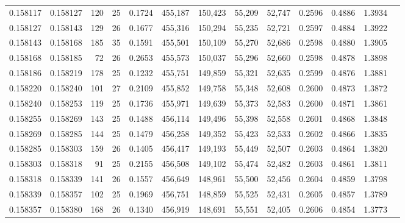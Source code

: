 \begin{tabular}{rrrrrrrrrrrrr}
0.158117 & 0.158127 & 120 &  25 &                                     0.1724 & 455,187 & 150,423 &  55,209 &  52,747 & 0.2596 & 0.4886 & 1.3934 \\
0.158127 & 0.158143 & 129 &  26 &                                     0.1677 & 455,316 & 150,294 &  55,235 &  52,721 & 0.2597 & 0.4884 & 1.3922 \\
0.158143 & 0.158168 & 185 &  35 &                                     0.1591 & 455,501 & 150,109 &  55,270 &  52,686 & 0.2598 & 0.4880 & 1.3905 \\
0.158168 & 0.158185 &  72 &  26 &                                     0.2653 & 455,573 & 150,037 &  55,296 &  52,660 & 0.2598 & 0.4878 & 1.3898 \\
0.158186 & 0.158219 & 178 &  25 &                                     0.1232 & 455,751 & 149,859 &  55,321 &  52,635 & 0.2599 & 0.4876 & 1.3881 \\
0.158220 & 0.158240 & 101 &  27 &                                     0.2109 & 455,852 & 149,758 &  55,348 &  52,608 & 0.2600 & 0.4873 & 1.3872 \\
0.158240 & 0.158253 & 119 &  25 &                                     0.1736 & 455,971 & 149,639 &  55,373 &  52,583 & 0.2600 & 0.4871 & 1.3861 \\
0.158255 & 0.158269 & 143 &  25 &                                     0.1488 & 456,114 & 149,496 &  55,398 &  52,558 & 0.2601 & 0.4868 & 1.3848 \\
0.158269 & 0.158285 & 144 &  25 &                                     0.1479 & 456,258 & 149,352 &  55,423 &  52,533 & 0.2602 & 0.4866 & 1.3835 \\
0.158285 & 0.158303 & 159 &  26 &                                     0.1405 & 456,417 & 149,193 &  55,449 &  52,507 & 0.2603 & 0.4864 & 1.3820 \\
0.158303 & 0.158318 &  91 &  25 &                                     0.2155 & 456,508 & 149,102 &  55,474 &  52,482 & 0.2603 & 0.4861 & 1.3811 \\
0.158318 & 0.158339 & 141 &  26 &                                     0.1557 & 456,649 & 148,961 &  55,500 &  52,456 & 0.2604 & 0.4859 & 1.3798 \\
0.158339 & 0.158357 & 102 &  25 &                                     0.1969 & 456,751 & 148,859 &  55,525 &  52,431 & 0.2605 & 0.4857 & 1.3789 \\
0.158357 & 0.158380 & 168 &  26 &                                     0.1340 & 456,919 & 148,691 &  55,551 &  52,405 & 0.2606 & 0.4854 & 1.3773 \\

\end{tabular}
